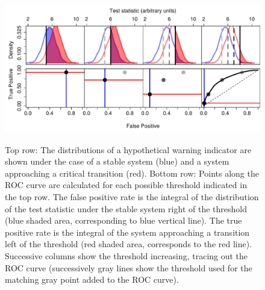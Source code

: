 \documentclass{pnastwo}
\begin{document}
 \begin{figure}
   \begin{center}
     \includegraphics[width=\linewidth]{Fig1}
     \label{fig1}
     \caption{Top row: The distributions of a hypothetical warning indicator are shown under the case of a stable system (blue) and a system approaching a critical transition (red).  Bottom row: Points along the ROC curve are calculated for each possible threshold indicated in the top row.  The false positive rate is the integral of the distribution of the test statistic under the stable system right of the threshold (blue shaded area, corresponding to blue vertical line).  The true positive rate is the integral of the system approaching a transition left of the threshold (red shaded area, corresponds to the red line).  Successive columns show the threshold increasing, tracing out the ROC curve (successively gray lines show the threshold used for the matching gray point added to the ROC curve).}
  \end{center}
 \end{figure}
\end{document}
